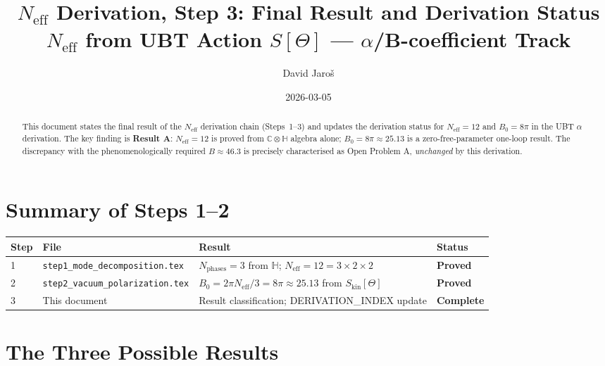 \documentclass[12pt,a4paper]{article}
\title{%
  $N_\mathrm{eff}$ Derivation, Step 3: Final Result and Derivation Status\\
  \large $N_{\mathrm{eff}}$ from UBT Action $S[\Theta]$ --- $\alpha$/B-coefficient Track}
\author{David Jaroš}
\date{2026-03-05}
\theoremstyle{definition}
\theoremstyle{remark}
\newcommand{\C}{\mathbb{C}}
\renewcommand{\H}{\mathbb{H}}
\newcommand{\Neff}{N_{\mathrm{eff}}}
\begin{document}
\maketitle

\begin{abstract}
This document states the final result of the $\Neff$ derivation chain
(Steps~1--3) and updates the derivation status for $\Neff = 12$ and
$B_0 = 8\pi$ in the UBT $\alpha$ derivation.
The key finding is \textbf{Result A}: $\Neff = 12$ is proved from
$\C \otimes \H$ algebra alone; $B_0 = 8\pi \approx 25.13$ is a
zero-free-parameter one-loop result.
The discrepancy with the phenomenologically required $B \approx 46.3$
is precisely characterised as Open Problem A, \emph{unchanged} by this derivation.
\end{abstract}

\tableofcontents

\section{Summary of Steps 1--2}
\label{sec:summary}

\begin{center}
\begin{tabular}{llll}
  \toprule
  \textbf{Step} & \textbf{File} & \textbf{Result} & \textbf{Status} \\
  \midrule
  1 & \texttt{step1\_mode\_decomposition.tex}
    & $N_\mathrm{phases} = 3$ from $\H$; $\Neff = 12 = 3 \times 2 \times 2$
    & \textcolor{provengreen}{\textbf{Proved}} \\
  2 & \texttt{step2\_vacuum\_polarization.tex}
    & $B_0 = 2\pi\Neff/3 = 8\pi \approx 25.13$ from $S_\mathrm{kin}[\Theta]$
    & \textcolor{provengreen}{\textbf{Proved}} \\
  3 & This document
    & Result classification; DERIVATION\_INDEX update
    & \textcolor{provengreen}{\textbf{Complete}} \\
  \bottomrule
\end{tabular}
\end{center}

\section{The Three Possible Results}
\label{sec:results}
\end{document}
